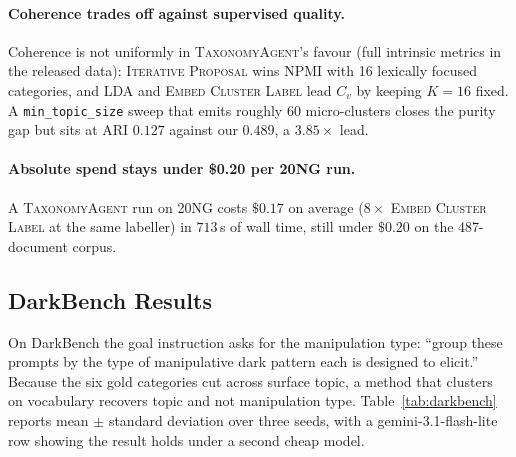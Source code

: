 \paragraph{Coherence trades off against supervised quality.}
Coherence is not uniformly in \textsc{TaxonomyAgent}'s favour (full
intrinsic metrics in the released data): \textsc{Iterative Proposal}
wins NPMI with 16 lexically focused categories, and LDA and
\textsc{Embed Cluster Label} lead $C_v$ by keeping $K{=}16$ fixed. A
\texttt{min\_topic\_size} sweep that emits roughly 60 micro-clusters
closes the purity gap but sits at ARI $0.127$ against our $0.489$, a
$3.85\times$ lead.

\paragraph{Absolute spend stays under \$0.20 per 20NG run.}
A \textsc{TaxonomyAgent} run on 20NG costs $\$0.17$ on average ($8\times$
\textsc{Embed Cluster Label} at the same labeller) in $713\,$s of wall
time, still under $\$0.20$ on the 487-document corpus.

\subsection{DarkBench Results}
\label{sec:eval-results-darkbench}

On DarkBench the goal instruction asks for the manipulation type:
``group these prompts by the type of manipulative dark pattern each is
designed to elicit.'' Because the six gold categories cut across
surface topic, a method that clusters on vocabulary recovers topic and
not manipulation type.
Table~\ref{tab:darkbench} reports mean $\pm$ standard deviation over
three seeds, with a gemini-3.1-flash-lite row showing the result holds
under a second cheap model.

